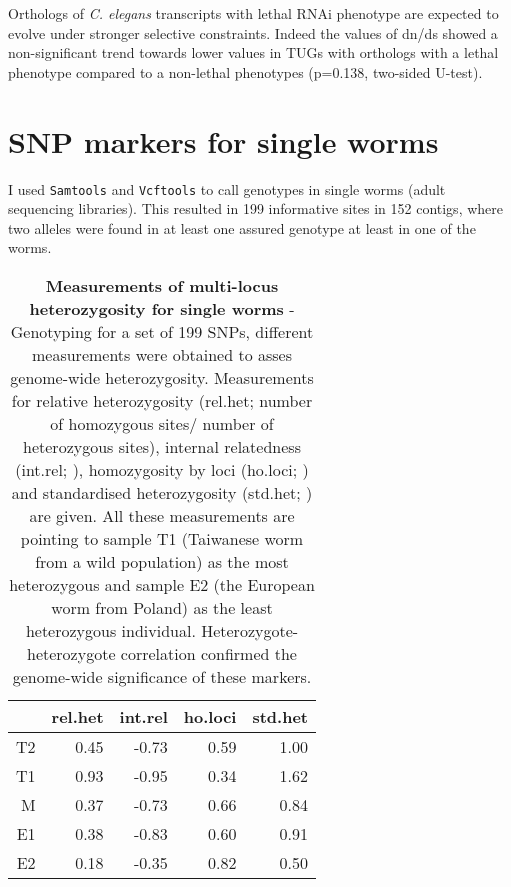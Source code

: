 
Orthologs of \textit{C. elegans} transcripts with lethal RNAi
phenotype are expected to evolve under stronger selective
constraints. Indeed the values of dn/ds showed a non-significant trend
towards lower values in TUGs with orthologs with a lethal phenotype
compared to a non-lethal phenotypes (p=0.138, two-sided U-test).

\section{SNP markers for single worms}
\label{sing-w}

I used \texttt{Samtools}\cite{journals/bioinformatics/LiHWFRHMAD09}
and \texttt{Vcftools}\cite{pmid21653522} to call genotypes in single
worms (adult sequencing libraries). This resulted in 199 informative
sites in 152 contigs, where two alleles were found in at least one
assured genotype at least in one of the worms.

\begin{table}[ht]
\begin{center}
\begin{tabular}{rrrrr}
  \hline
 & rel.het & int.rel & ho.loci & std.het \\ 
  \hline
T2 & 0.45 & -0.73 & 0.59 & 1.00 \\ 
  T1 & 0.93 & -0.95 & 0.34 & 1.62 \\ 
  M & 0.37 & -0.73 & 0.66 & 0.84 \\ 
  E1 & 0.38 & -0.83 & 0.60 & 0.91 \\ 
  E2 & 0.18 & -0.35 & 0.82 & 0.50 \\ 
   \hline
\end{tabular}
\caption[Measurements of multi-locus heterozygosity for single
worms]{\textbf{Measurements of multi-locus heterozygosity for single
    worms} - Genotyping for a set of 199 SNPs, different measurements
  were obtained to asses genome-wide heterozygosity.  Measurements for
  relative heterozygosity (rel.het; number of homozygous sites/ number
  of heterozygous sites), internal relatedness (int.rel;
  \cite{pmid11571049}), homozygosity by loci (ho.loci;
  \cite{pmid17107491}) and standardised heterozygosity (std.het;
  \cite{coltman81j}) are given.  All these measurements are pointing
  to sample T1 (Taiwanese worm from a wild population) as the most
  heterozygous and sample E2 (the European worm from Poland) as the
  least heterozygous individual. Heterozygote-heterozygote correlation
  \cite{pmid21565077} confirmed the genome-wide significance of these
  markers.}
\label{snp-sing}
\end{center}
\end{table}

